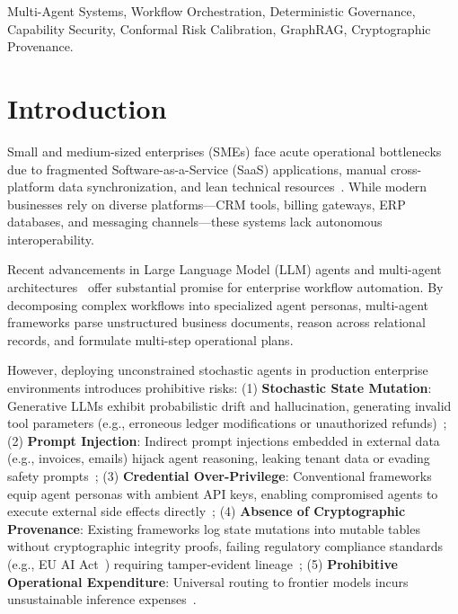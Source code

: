 \documentclass[conference]{IEEEtran}
\begin{document}
\begin{IEEEkeywords}
Multi-Agent Systems, Workflow Orchestration, Deterministic Governance, Capability Security, Conformal Risk Calibration, GraphRAG, Cryptographic Provenance.
\end{IEEEkeywords}

\section{Introduction}

Small and medium-sized enterprises (SMEs) face acute operational bottlenecks due to fragmented Software-as-a-Service (SaaS) applications, manual cross-platform data synchronization, and lean technical resources~\cite{weske2019bpm}. While modern businesses rely on diverse platforms---CRM tools, billing gateways, ERP databases, and messaging channels---these systems lack autonomous interoperability. 

Recent advancements in Large Language Model (LLM) agents and multi-agent architectures~\cite{yao2023react, schick2023toolformer, wu2023autogen, langgraph2024, hong2024metagpt, wang2024agentsurvey, xi2023rise} offer substantial promise for enterprise workflow automation. By decomposing complex workflows into specialized agent personas, multi-agent frameworks parse unstructured business documents, reason across relational records, and formulate multi-step operational plans.

However, deploying unconstrained stochastic agents in production enterprise environments introduces prohibitive risks: (1) \textbf{Stochastic State Mutation}: Generative LLMs exhibit probabilistic drift and hallucination, generating invalid tool parameters (e.g., erroneous ledger modifications or unauthorized refunds)~\cite{ruan2024toolemu}; (2) \textbf{Prompt Injection}: Indirect prompt injections embedded in external data (e.g., invoices, emails) hijack agent reasoning, leaking tenant data or evading safety prompts~\cite{greshake2023promptinjection, perez2022ignore}; (3) \textbf{Credential Over-Privilege}: Conventional frameworks equip agent personas with ambient API keys, enabling compromised agents to execute external side effects directly~\cite{qin2024toolllm}; (4) \textbf{Absence of Cryptographic Provenance}: Existing frameworks log state mutations into mutable tables without cryptographic integrity proofs, failing regulatory compliance standards (e.g., EU AI Act~\cite{euai2024}) requiring tamper-evident lineage~\cite{crosby2009tamper, moreau2013prov}; (5) \textbf{Prohibitive Operational Expenditure}: Universal routing to frontier models incurs unsustainable inference expenses~\cite{chen2023frugalgpt, ong2024routellm}.
\end{document}
